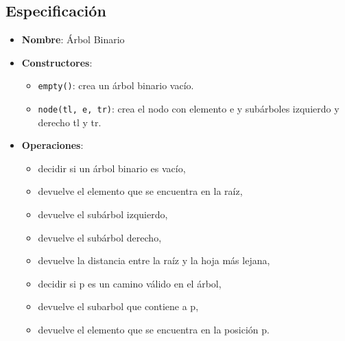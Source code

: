 \subsection{Especificación}
\begin{itemize}
    \item \textbf{Nombre}: Árbol Binario
    \item \textbf{Constructores}:
    \begin{itemize}
        \item \texttt{empty()}: crea un árbol binario vacío.
        \item \texttt{node(tl, e, tr)}: crea el nodo con elemento e y subárboles izquierdo y derecho tl y tr. 
    \end{itemize}
    \item \textbf{Operaciones}:
    \begin{itemize}
        \item decidir si un árbol binario es vacío,
        \item devuelve el elemento que se encuentra en la raíz,
        \item devuelve el subárbol izquierdo,
        \item devuelve el subárbol derecho,
        \item devuelve la distancia entre la raíz y la hoja más lejana,
        \item decidir si p es un camino válido en el árbol,
        \item devuelve el subarbol que contiene a p,
        \item devuelve el elemento que se encuentra en la posición p.
    \end{itemize}
\end{itemize}

